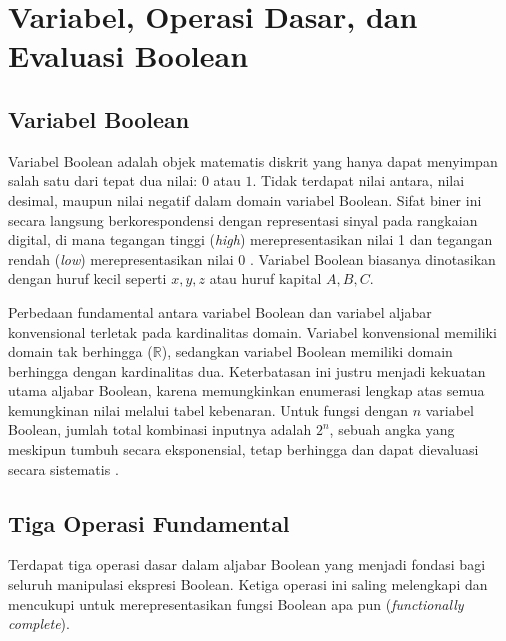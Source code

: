 \section{Variabel, Operasi Dasar, dan Evaluasi Boolean}

\subsection{Variabel Boolean}

Variabel Boolean adalah objek matematis diskrit yang hanya dapat menyimpan salah satu dari tepat dua nilai: $0$ atau $1$. Tidak terdapat nilai antara, nilai desimal, maupun nilai negatif dalam domain variabel Boolean. Sifat biner ini secara langsung berkorespondensi dengan representasi sinyal pada rangkaian digital, di mana tegangan tinggi (\textit{high}) merepresentasikan nilai 1 dan tegangan rendah (\textit{low}) merepresentasikan nilai 0 \cite{uw_boolean}. Variabel Boolean biasanya dinotasikan dengan huruf kecil seperti $x, y, z$ atau huruf kapital $A, B, C$.

Perbedaan fundamental antara variabel Boolean dan variabel aljabar konvensional terletak pada kardinalitas domain. Variabel konvensional memiliki domain tak berhingga ($\mathbb{R}$), sedangkan variabel Boolean memiliki domain berhingga dengan kardinalitas dua. Keterbatasan ini justru menjadi kekuatan utama aljabar Boolean, karena memungkinkan enumerasi lengkap atas semua kemungkinan nilai melalui tabel kebenaran. Untuk fungsi dengan $n$ variabel Boolean, jumlah total kombinasi inputnya adalah $2^n$, sebuah angka yang meskipun tumbuh secara eksponensial, tetap berhingga dan dapat dievaluasi secara sistematis \cite{rosen2019}.

\subsection{Tiga Operasi Fundamental}

Terdapat tiga operasi dasar dalam aljabar Boolean yang menjadi fondasi bagi seluruh manipulasi ekspresi Boolean. Ketiga operasi ini saling melengkapi dan mencukupi untuk merepresentasikan fungsi Boolean apa pun (\textit{functionally complete}).

